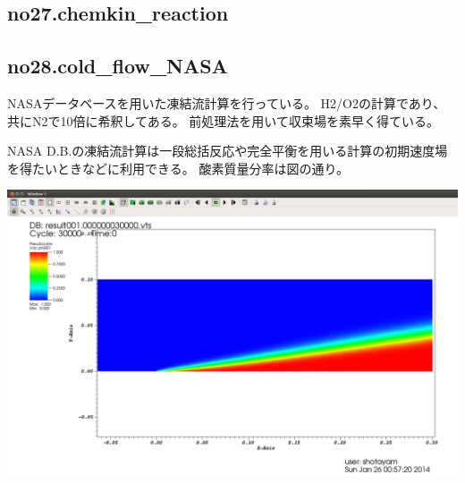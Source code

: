 \documentclass{jsarticle}
\begin{document}
\subsection{no27.chemkin\_reaction}%
\subsection{no28.cold\_flow\_NASA}%
NASAデータベースを用いた凍結流計算を行っている。
H2/O2の計算であり、共にN2で10倍に希釈してある。
前処理法を用いて収束場を素早く得ている。

NASA D.B.の凍結流計算は一段総括反応や完全平衡を用いる計算の初期速度場を得たいときなどに利用できる。
酸素質量分率は図の通り。
\begin{center}
\includegraphics[width=.8\textwidth,bb=0 0 1663 1056]{sample/no28.png}
\end{center}
\end{document}
